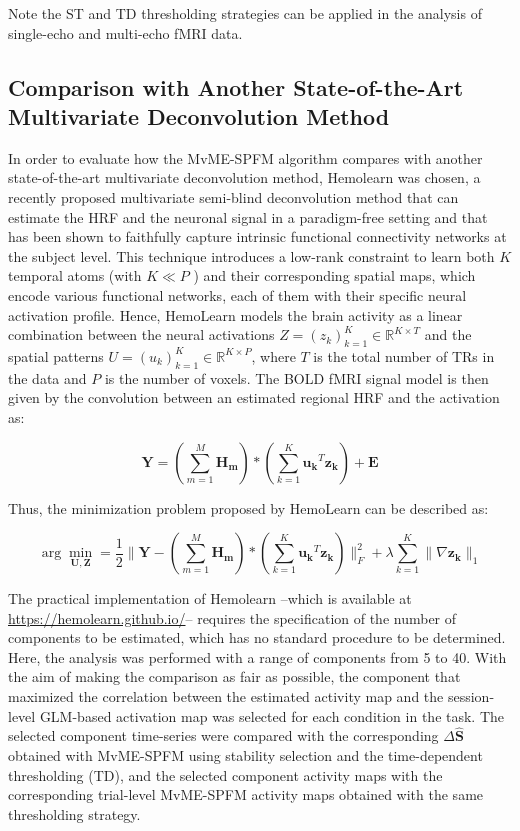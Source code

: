 Note the ST and TD thresholding strategies can be applied in the analysis of
single-echo and multi-echo fMRI data. 

\subsection{Comparison with Another State-of-the-Art Multivariate Deconvolution Method}

In order to evaluate how the MvME-SPFM algorithm compares with another
state-of-the-art multivariate deconvolution method, Hemolearn
\citep{Cherkaoui2021Multivariatesemiblind} was chosen, a recently proposed
multivariate semi-blind deconvolution method that can estimate the HRF and the
neuronal signal in a paradigm-free setting and that has been shown to faithfully
capture intrinsic functional connectivity networks at the subject level. This
technique introduces a low-rank constraint to learn both $K$ temporal atoms
(with $K \ll P$ ) and their corresponding spatial maps, which encode various
functional networks, each of them with their specific neural activation profile.
Hence, HemoLearn models the brain activity as a linear combination between the
neural activations $Z = \left( z_k \right)_{k=1}^K \in \mathbb{R}^{K \times T}$
and the spatial patterns $U = \left( u_k \right)_{k=1}^K \in \mathbb{R}^{K
\times P}$, where $T$ is the total number of TRs in the data and $P$ is the
number of voxels. The BOLD fMRI signal model is then given by the convolution between
an estimated regional HRF and the activation as:

\begin{equation}
    \mathbf{Y} = \left( \sum_{m=1}^M \mathbf{H_m} \right) * \left( \sum_{k=1}^K \mathbf{u_k}^T \mathbf{z_k} \right) + \mathbf{E}
\end{equation}

Thus, the minimization problem proposed by HemoLearn can be described as:

\begin{equation}
    \arg \min_{\mathbf{U}, \mathbf{Z}} = \frac{1}{2} \| \mathbf{Y} - \left( \sum_{m=1}^M \mathbf{H_m} \right) * \left( \sum_{k=1}^K \mathbf{u_k}^T \mathbf{z_k} \right) \|_F^2 + \lambda \sum_{k=1}^K \| \nabla \mathbf{z_k} \|_1
\end{equation}

The practical implementation of Hemolearn --which is available at
\url{https://hemolearn.github.io/}-- requires the specification of the number of
components to be estimated, which has no standard procedure to be determined.
Here, the analysis was performed with a range of components from 5 to 40. With
the aim of making the comparison as fair as possible, the component that
maximized the correlation between the estimated activity map and the
session-level GLM-based activation map was selected for each condition in the
task. The selected component time-series were compared with the corresponding
$\Delta \hat{\mathbf{S}}$ obtained with MvME-SPFM using stability selection and
the time-dependent thresholding (TD), and the selected component activity maps
with the corresponding trial-level MvME-SPFM activity maps obtained with the
same thresholding strategy.

